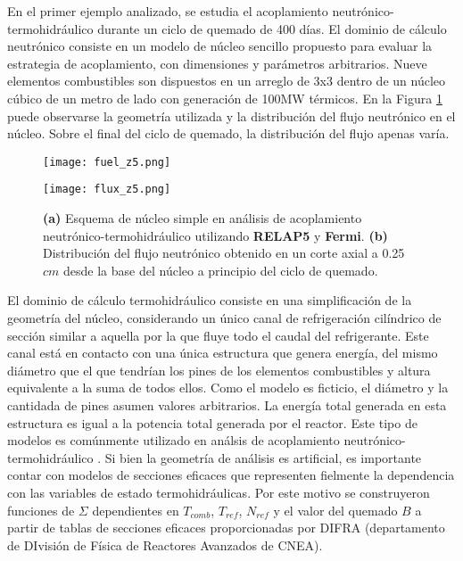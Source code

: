 En el primer ejemplo analizado, se estudia el acoplamiento neutrónico-termohidráulico durante un ciclo de quemado de 400 días.
El dominio de cálculo neutrónico consiste en un modelo de núcleo sencillo propuesto para evaluar la estrategia de acoplamiento,
con dimensiones y parámetros arbitrarios.
Nueve elementos combustibles son dispuestos en un arreglo de 3x3 dentro de un núcleo cúbico de un metro de lado con generación de 100MW térmicos.
En la Figura \ref{fuel_z5} puede observarse la geometría utilizada y la distribución del flujo neutrónico en el núcleo.
Sobre el final del ciclo de quemado, la distribución del flujo apenas varía.

\begin{figure}[ht]
	\begin{minipage}{0.5\linewidth}
		\centering
		\texttt{[image: fuel\_z5.png]}
	\end{minipage}
	\begin{minipage}{0.5\linewidth}
		\centering
		\texttt{[image: flux\_z5.png]}
	\end{minipage}
\caption[Núcleo simple en análisis de acoplamiento neutrónico-termohidráulico utilizando \textit{RELAP5} y \textit{Fermi}]
{\textbf{(a)} Esquema de núcleo simple en análisis de acoplamiento neutrónico-termohidráulico utilizando \textbf{RELAP5} y \textbf{Fermi}.
\textbf{(b)} Distribución del flujo neutrónico obtenido en un corte axial a 0.25 $cm$ desde la base del núcleo a principio del ciclo de quemado.
}
\label{fuel_z5}
\end{figure}
El dominio de cálculo termohidráulico consiste en una simplificación de la geometría del núcleo,
considerando un único canal de refrigeración cilíndrico de sección similar a aquella por la que fluye todo el caudal del refrigerante.
Este canal está en contacto con una única estructura que genera energía, 
del mismo diámetro que el que tendrían los pines de los elementos combustibles y altura equivalente a la suma de todos ellos.
Como el modelo es ficticio, el diámetro y la cantidada de pines asumen valores arbitrarios.
La energía total generada en esta estructura es igual a la potencia total generada por el reactor. 
Este tipo de modelos es comúnmente utilizado en análsis de acoplamiento neutrónico-termohidráulico \cite{pumita-relap}.
Si bien la geometría de análisis es artificial, 
es importante contar con modelos de secciones eficaces que representen fielmente la dependencia con las variables de estado termohidráulicas.
Por este motivo se construyeron funciones de $\Sigma$ dependientes en $T_{comb}$, $T_{ref}$, $N_{ref}$ y el valor del quemado $B$
a partir de tablas de secciones eficaces proporcionadas por DIFRA (departamento de DIvisión de Física de Reactores Avanzados de CNEA).

